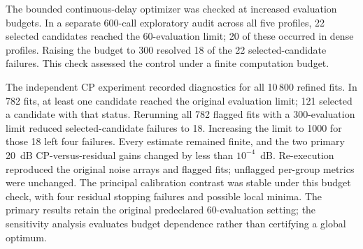 The bounded continuous-delay optimizer was checked at increased evaluation
budgets. In a separate 600-call exploratory audit across all five
profiles, 22 selected candidates reached the 60-evaluation limit; 20 of
these occurred in dense profiles. Raising the budget to 300 resolved
18 of the 22 selected-candidate failures. This check assessed the control
under a finite computation budget.

The independent CP experiment recorded diagnostics for all 10\,800 refined
fits. In 782 fits, at least one candidate reached the original evaluation
limit; 121 selected a candidate with that status. Rerunning all 782 flagged
fits with a 300-evaluation limit reduced selected-candidate failures to 18.
Increasing the limit to 1000 for those 18 left four failures. Every estimate
remained finite, and the two primary 20~dB CP-versus-residual gains changed
by less than $10^{-4}$~dB. Re-execution reproduced the original noise arrays
and flagged fits; unflagged per-group metrics were unchanged. The principal
calibration contrast was stable under this budget check, with four residual
stopping failures and possible local minima. The primary results retain the
original predeclared 60-evaluation setting; the sensitivity analysis evaluates
budget dependence rather than certifying a global optimum.

